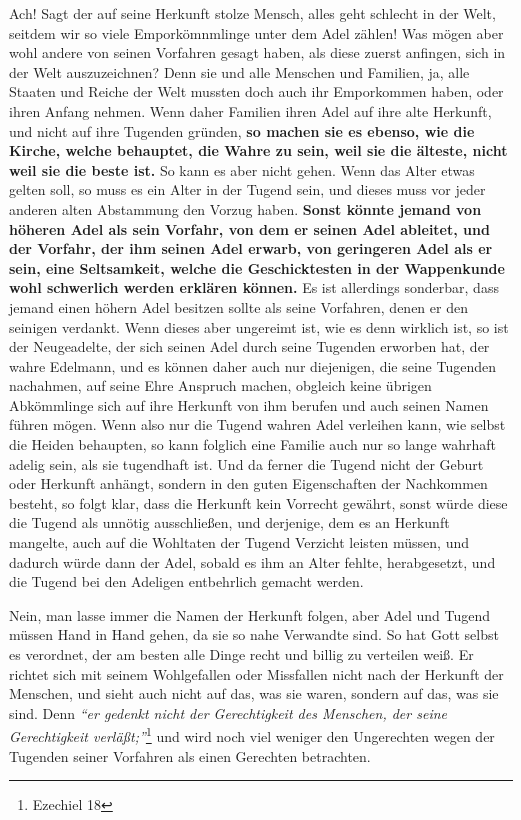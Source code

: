 Ach! Sagt der auf seine Herkunft stolze Mensch, alles geht schlecht in der Welt,
seitdem wir so viele Emporkömnmlinge unter dem
Adel
zählen! Was mögen aber wohl
andere von seinen Vorfahren gesagt haben, als diese zuerst anfingen, sich in der
Welt auszuzeichnen? Denn sie und alle Menschen und Familien, ja, alle Staaten
und Reiche der Welt mussten doch auch ihr Emporkommen haben, oder ihren Anfang
nehmen. Wenn daher Familien ihren Adel auf ihre alte Herkunft, und nicht auf
ihre
Tugenden gründen, \label{ref:11_04_abstammung} \textbf{so machen sie es ebenso,
wie  die Kirche, welche behauptet,
die Wahre zu sein, weil sie die älteste, nicht weil sie die beste ist.} So kann
es aber nicht gehen. Wenn das Alter etwas gelten soll, so muss es ein Alter in
der Tugend sein, und dieses muss vor jeder anderen alten Abstammung den Vorzug
haben. \textbf{Sonst könnte jemand von höheren Adel als sein Vorfahr, von dem er
seinen
Adel ableitet, und der Vorfahr, der ihm seinen Adel erwarb, von geringeren Adel
als er sein, eine Seltsamkeit, welche die Geschicktesten in der
Wappenkunde wohl
schwerlich werden erklären können.} Es ist allerdings sonderbar, dass jemand
einen höhern Adel besitzen sollte als seine Vorfahren, denen er den seinigen
verdankt. Wenn dieses aber ungereimt ist, wie es denn wirklich ist, so ist der
Neugeadelte, der sich seinen Adel durch seine Tugenden erworben hat, der wahre
Edelmann, und es können daher auch nur diejenigen, die seine Tugenden
nachahmen, auf seine Ehre Anspruch machen, obgleich keine übrigen Abkömmlinge
sich auf ihre Herkunft von ihm berufen und auch seinen Namen führen mögen. Wenn
also nur die Tugend wahren Adel verleihen kann, wie selbst die
Heiden behaupten,
so kann folglich eine Familie auch nur so lange wahrhaft adelig sein, als sie
tugendhaft ist. Und da ferner die Tugend nicht der Geburt oder Herkunft anhängt,
sondern in den guten Eigenschaften der Nachkommen besteht, so folgt klar, dass
die Herkunft kein Vorrecht gewährt, sonst würde diese die Tugend als unnötig
ausschließen, und derjenige, dem es an Herkunft mangelte, auch auf die Wohltaten
der Tugend Verzicht leisten müssen, und dadurch würde dann der Adel, sobald es
ihm an Alter fehlte, herabgesetzt, und die Tugend bei den Adeligen entbehrlich
gemacht werden.

\medskip

Nein, man lasse immer die Namen der Herkunft folgen, aber Adel und Tugend müssen
Hand in Hand gehen, da sie so nahe Verwandte sind. So hat Gott selbst es
verordnet, der am besten alle Dinge recht und billig zu verteilen weiß. Er
richtet sich mit seinem Wohlgefallen oder Missfallen nicht nach der Herkunft der
Menschen, und sieht auch nicht auf das, was sie waren, sondern auf das, was sie
sind. Denn
\textit{"`er gedenkt nicht der Gerechtigkeit des Menschen, der seine
Gerechtigkeit verläßt;"'}\footnote{Ezechiel 18}
und wird noch viel weniger den
Ungerechten wegen der Tugenden seiner Vorfahren als einen Gerechten betrachten.

